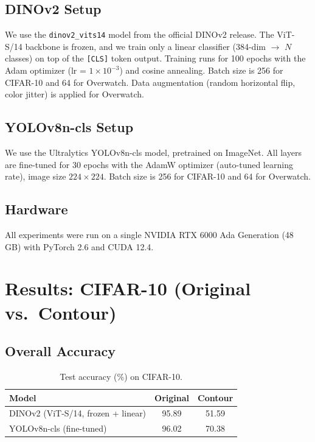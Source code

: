 \documentclass[11pt,a4paper]{article}
\begin{document}
\subsection{DINOv2 Setup}

We use the \texttt{dinov2\_vits14} model from the official DINOv2 release. The ViT-S/14 backbone is frozen, and we train only a linear classifier (384-dim $\rightarrow$ $N$ classes) on top of the \texttt{[CLS]} token output. Training runs for 100 epochs with the Adam optimizer (lr = $1\times10^{-3}$) and cosine annealing. Batch size is 256 for CIFAR-10 and 64 for Overwatch. Data augmentation (random horizontal flip, color jitter) is applied for Overwatch.

\subsection{YOLOv8n-cls Setup}

We use the Ultralytics YOLOv8n-cls model, pretrained on ImageNet. All layers are fine-tuned for 30 epochs with the AdamW optimizer (auto-tuned learning rate), image size $224 \times 224$. Batch size is 256 for CIFAR-10 and 64 for Overwatch.

\subsection{Hardware}

All experiments were run on a single NVIDIA RTX 6000 Ada Generation (48 GB) with PyTorch 2.6 and CUDA 12.4.

\section{Results: CIFAR-10 (Original vs.\ Contour)}

\subsection{Overall Accuracy}

\begin{table}[H]
    \centering
    \caption{Test accuracy (\%) on CIFAR-10.}
    \label{tab:cifar_accuracy}
    \begin{tabular}{lcc}
        \toprule
        \textbf{Model} & \textbf{Original} & \textbf{Contour} \\
        \midrule
        DINOv2 (ViT-S/14, frozen + linear) & 95.89 & 51.59 \\
        YOLOv8n-cls (fine-tuned) & 96.02 & 70.38 \\
        \bottomrule
    \end{tabular}
\end{table}
\end{document}
